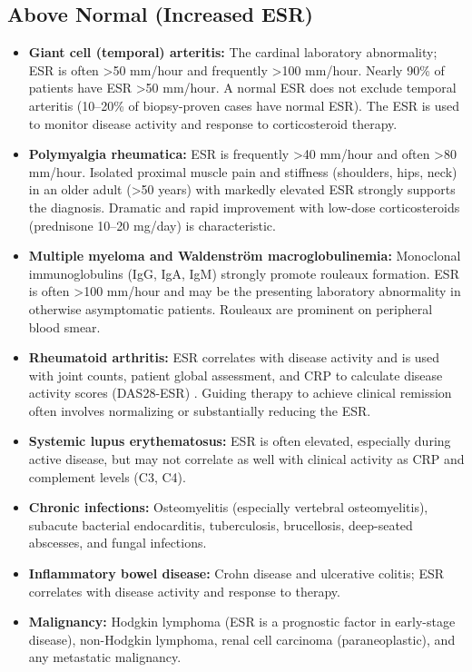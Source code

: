 \subsection*{Above Normal (Increased ESR)}
\begin{itemize}
  \item \textbf{Giant cell (temporal) arteritis:} The cardinal laboratory abnormality; ESR is often >50 mm/hour and frequently >100 mm/hour. Nearly 90\% of patients have ESR >50 mm/hour. A normal ESR does not exclude temporal arteritis (10--20\% of biopsy-proven cases have normal ESR). The ESR is used to monitor disease activity and response to corticosteroid therapy.
  \item \textbf{Polymyalgia rheumatica:} ESR is frequently >40 mm/hour and often >80 mm/hour. Isolated proximal muscle pain and stiffness (shoulders, hips, neck) in an older adult (>50 years) with markedly elevated ESR strongly supports the diagnosis. Dramatic and rapid improvement with low-dose corticosteroids (prednisone 10--20 mg/day) is characteristic.
  \item \textbf{Multiple myeloma and Waldenstr\"{o}m macroglobulinemia:} Monoclonal immunoglobulins (IgG, IgA, IgM) strongly promote rouleaux formation. ESR is often >100 mm/hour and may be the presenting laboratory abnormality in otherwise asymptomatic patients. Rouleaux are prominent on peripheral blood smear.
  \item \textbf{Rheumatoid arthritis:} ESR correlates with disease activity and is used with joint counts, patient global assessment, and CRP to calculate disease activity scores (DAS28-ESR) \cite{sokka2009erythrocyte}. Guiding therapy to achieve clinical remission often involves normalizing or substantially reducing the ESR.
  \item \textbf{Systemic lupus erythematosus:} ESR is often elevated, especially during active disease, but may not correlate as well with clinical activity as CRP and complement levels (C3, C4).
  \item \textbf{Chronic infections:} Osteomyelitis (especially vertebral osteomyelitis), subacute bacterial endocarditis, tuberculosis, brucellosis, deep-seated abscesses, and fungal infections.
  \item \textbf{Inflammatory bowel disease:} Crohn disease and ulcerative colitis; ESR correlates with disease activity and response to therapy.
  \item \textbf{Malignancy:} Hodgkin lymphoma (ESR is a prognostic factor in early-stage disease), non-Hodgkin lymphoma, renal cell carcinoma (paraneoplastic), and any metastatic malignancy.

\end{itemize}
